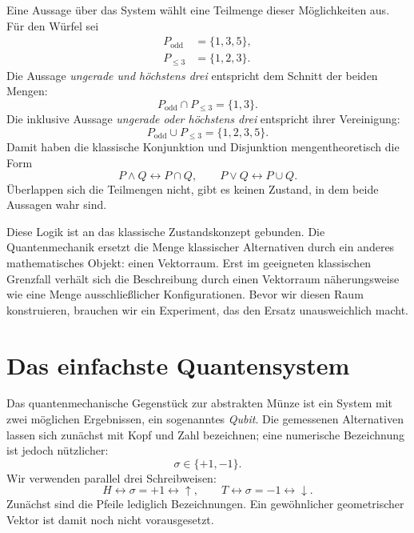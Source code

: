 Eine Aussage über das System wählt eine Teilmenge dieser Möglichkeiten aus. Für den Würfel sei
\begin{align}
  P_{\mathrm{odd}}&=\{1,3,5\},\\
  P_{\leq 3}&=\{1,2,3\}.
\end{align}
Die Aussage \emph{ungerade und höchstens drei} entspricht dem Schnitt der beiden Mengen:
\begin{equation}
  P_{\mathrm{odd}}\cap P_{\leq 3}=\{1,3\}.
\end{equation}
Die inklusive Aussage \emph{ungerade oder höchstens drei} entspricht ihrer Vereinigung:
\begin{equation}
  P_{\mathrm{odd}}\cup P_{\leq 3}
  =
  \{1,2,3,5\}.
\end{equation}
Damit haben die klassische Konjunktion und Disjunktion mengentheoretisch die Form
\begin{equation}
  P\wedge Q\longleftrightarrow P\cap Q,
  \qquad
  P\vee Q\longleftrightarrow P\cup Q.
\end{equation}
Überlappen sich die Teilmengen nicht, gibt es keinen Zustand, in dem beide Aussagen wahr sind.

Diese Logik ist an das klassische Zustandskonzept gebunden. Die Quantenmechanik ersetzt die Menge klassischer Alternativen durch ein anderes mathematisches Objekt: einen Vektorraum. Erst im geeigneten klassischen Grenzfall verhält sich die Beschreibung durch einen Vektorraum näherungsweise wie eine Menge ausschließlicher Konfigurationen. Bevor wir diesen Raum konstruieren, brauchen wir ein Experiment, das den Ersatz unausweichlich macht.

\section{Das einfachste Quantensystem}

Das quantenmechanische Gegenstück zur abstrakten Münze ist ein System mit zwei möglichen Ergebnissen, ein sogenanntes \emph{Qubit}. Die gemessenen Alternativen lassen sich zunächst mit Kopf und Zahl bezeichnen; eine numerische Bezeichnung ist jedoch nützlicher:
\begin{equation}
  \sigma\in\{+1,-1\}.
\end{equation}
Wir verwenden parallel drei Schreibweisen:
\begin{equation}
  H\longleftrightarrow \sigma=+1\longleftrightarrow\uparrow,
  \qquad
  T\longleftrightarrow \sigma=-1\longleftrightarrow\downarrow.
\end{equation}
Zunächst sind die Pfeile lediglich Bezeichnungen. Ein gewöhnlicher geometrischer Vektor ist damit noch nicht vorausgesetzt.

